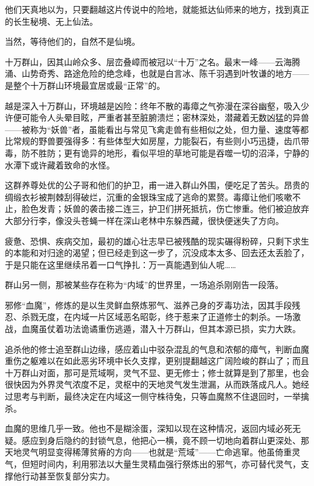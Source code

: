 他们天真地以为，只要翻越这片传说中的险地，就能抵达仙师来的地方，找到真正的长生秘境、无上仙法。

当然，等待他们的，自然不是仙境。

十万群山，因其山岭众多、层峦叠嶂而被冠以“十万”之名。最末一峰——云海腾涌、山势奇秀、路途危险的绝念峰，也就是白言冰、陈千羽遇到叶牧谦的地方——是整个十万群山环境最宜居或最“正常”的。

越是深入十万群山，环境越是凶险：终年不散的毒瘴之气弥漫在深谷幽壑，吸入少许便可能令人头晕目眩，严重者甚至脏腑溃烂；密林深处，潜藏着无数凶猛的异兽——被称为“妖兽”者，虽能看出与常见飞禽走兽有些相似之处，但力量、速度等都比常规的野兽要强得多：有些体型大如房屋，力能裂石，有些则小巧迅捷，齿爪带毒，防不胜防；更有诡异的地形，看似平坦的草地可能是吞噬一切的沼泽，宁静的水潭下或许藏着致命的水怪。

这群养尊处优的公子哥和他们的护卫，甫一进入群山外围，便吃足了苦头。昂贵的绸缎衣衫被荆棘刮得破烂，沉重的金银珠宝成了逃命的累赘。毒瘴让他们咳嗽不止，脸色发青；妖兽的袭击接二连三，护卫们拼死抵抗，伤亡惨重。他们被迫放弃大部分行李，像没头苍蝇一样在深山老林中东躲西藏，很快便迷失了方向。

疲惫、恐惧、疾病交加，最初的雄心壮志早已被残酷的现实碾得粉碎，只剩下求生的本能和对归途的渴望；但已经走到这一步了，沉没成本太多、回去还太丢脸了，于是只能在这里继续吊着一口气挣扎：万一真能遇到仙人呢……

\vspace{2em}

群山另一侧，那被某些存在称为“内域”的世界里，一场追杀刚刚告一段落。

邪修“血魔”，修炼的是以生灵鲜血祭炼邪气、滋养己身的歹毒功法，因其手段残忍、杀戮无度，在内域一片区域恶名昭彰，终于惹来了正道修士的刺杀。一场激战，血魔虽仗着功法诡谲重伤逃遁，潜入十万群山，但其本源已损，实力大跌。

追杀他的修士追至群山边缘，感应着山中驳杂混乱的气息和浓郁的瘴气，判断血魔重伤之躯难以在如此恶劣环境中长久支撑，更别提翻越这广阔险峻的群山了；而且十万群山对面，那可是荒域啊，灵气不显、更无修士；修士就算是到了那里，也会很快因为外界灵气浓度不足，灵枢中的天地灵气发生泄漏，从而跌落成凡人。她经过思考与判断，最终决定在内域这一侧守株待兔，只等血魔熬不住退回时，一举擒杀。

血魔的思维几乎一致。他也不是糊涂蛋，深知以现在这种情况，返回内域必死无疑。感应到身后隐约的封锁气息，他把心一横，竟不顾一切地向着群山更深处、那天地灵气明显变得稀薄贫瘠的方向——也就是“荒域”——亡命逃窜。他虽倚重灵气，但短时间内，利用邪法以大量生灵精血强行祭炼出的邪气，亦可替代灵气，支撑他行动甚至恢复部分实力。

